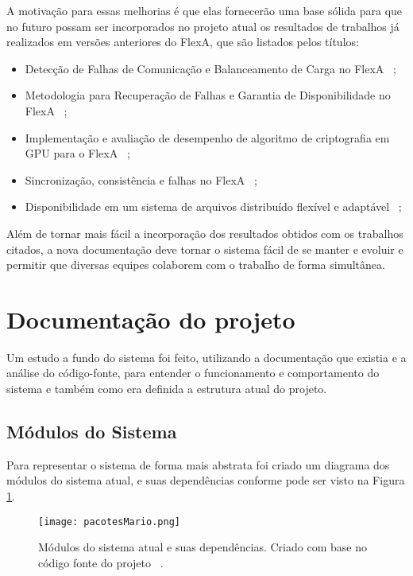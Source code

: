         A motivação para essas melhorias é que elas fornecerão uma base sólida para que no futuro possam ser incorporados no projeto atual os resultados de trabalhos já realizados em versões anteriores do FlexA, que são listados pelos títulos:
        
        \begin{itemize}
            \item Detecção de Falhas de Comunicação e Balanceamento de Carga no FlexA ~\cite{danilo};
            \item Metodologia para Recuperação de Falhas e Garantia de Disponibilidade no FlexA ~\cite{thiago};
            \item Implementação e avaliação de desempenho de algoritmo de criptografia em GPU para o FlexA ~\cite{leandro};
            \item Sincronização, consistência e falhas no FlexA ~\cite{matheus};
            \item Disponibilidade em um sistema de arquivos distribuído flexível e adaptável ~\cite{lucio};
        \end{itemize}
        
       
    Além de tornar mais fácil a incorporação dos resultados obtidos com os trabalhos citados, a nova documentação deve tornar o sistema fácil de se manter e evoluir e permitir que diversas equipes colaborem com o trabalho de forma simultânea.
    
    
        
    \section{Documentação do projeto}
        
    Um estudo a fundo do sistema foi feito, utilizando a documentação que existia e a análise do código-fonte, para entender o funcionamento e comportamento do sistema e também como era definida a estrutura atual do projeto. 
    
    \subsection{Módulos do Sistema}
    
        Para representar o sistema de forma mais abstrata foi criado um diagrama dos módulos do sistema atual, e suas dependências conforme pode ser visto na Figura \ref{fig:pacotesMario}.
        
        \begin{figure}[!ht]
            \centering
            \texttt{[image: pacotesMario.png]}
            \caption{Módulos do sistema atual e suas dependências. Criado com base no código fonte do projeto ~\cite{mario}.}
            \label{fig:pacotesMario}
        \end{figure}
        

